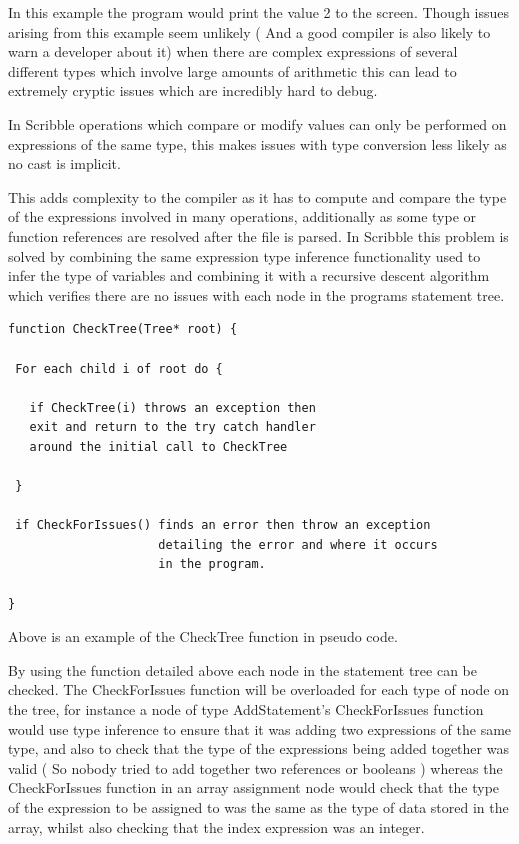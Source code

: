 \documentclass[]{final_report}
\begin{document}
In this example the program would print the value 2 to the screen. Though issues arising from this example seem unlikely ( And a good compiler is also likely to warn a developer about it) when there are complex expressions of several different types which involve large amounts of arithmetic this can lead to extremely cryptic issues which are incredibly hard to debug.

In Scribble operations which compare or modify values can only be performed on expressions of the same type, this makes issues with type conversion less likely as no cast is implicit. 

This adds complexity to the compiler as it has to compute and compare the type of the expressions involved in many operations, additionally as some type or function references are resolved after the file is parsed. In Scribble this problem is solved by combining the same expression type inference functionality used to infer the type of variables and combining it with a recursive descent algorithm which verifies there are no issues with each node in the programs statement tree.

\begin{verbatim}
function CheckTree(Tree* root) {
 
 For each child i of root do {

   if CheckTree(i) throws an exception then 
   exit and return to the try catch handler 
   around the initial call to CheckTree
   
 }
 
 if CheckForIssues() finds an error then throw an exception 
 					 detailing the error and where it occurs 
 					 in the program.

}
\end{verbatim}
Above is an example of the CheckTree function in pseudo code.

By using the function detailed above each node in the statement tree can be checked. The CheckForIssues function will be overloaded for each type of node on the tree, for instance a node of type AddStatement's CheckForIssues function would use type inference to ensure that it was adding two expressions of the same type, and also to check that the type of the expressions being added together was valid ( So nobody tried to add together two references or booleans ) whereas the CheckForIssues function in an array assignment node would check that the type of the expression to be assigned to  was the same as the type of data stored in the array, whilst also checking that the index expression was an integer.
\end{document}
